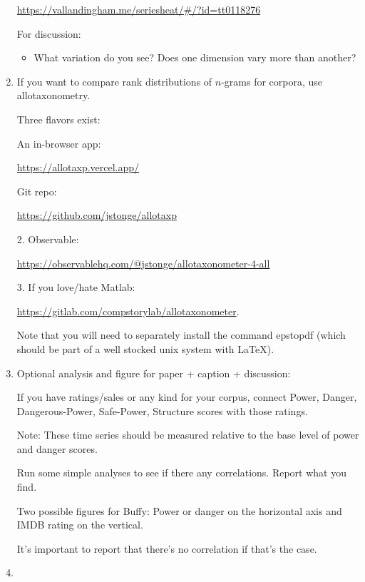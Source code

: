 \begin{enumerate}
  \url{https://vallandingham.me/seriesheat/#/?id=tt0118276}

  For discussion:
  \begin{itemize}
  \item
    What variation do you see? Does one dimension vary more than another?
  \end{itemize}

\item

  If you want to compare rank distributions of $n$-grams for corpora,
  use allotaxonometry.

  Three flavors exist:

  An in-browser app:

  \href{https://allotaxp.vercel.app/}{https://allotaxp.vercel.app/}

  Git repo:
  
  \href{https://github.com/jstonge/allotaxp}{https://github.com/jstonge/allotaxp}
  
  2. Observable:

  \href{https://observablehq.com/@jstonge/allotaxonometer-4-all}{https://observablehq.com/@jstonge/allotaxonometer-4-all}

  3. If you love/hate Matlab:
  
  \href{https://gitlab.com/compstorylab/allotaxonometer}{https://gitlab.com/compstorylab/allotaxonometer}.

  Note that you will need to separately install the command epstopdf (which should be part of a well stocked unix system with \LaTeX).

  
\item
  Optional analysis and figure for paper + caption + discussion:

  If you have ratings/sales or any kind for your corpus,
  connect Power, Danger, Dangerous-Power, Safe-Power, Structure scores
  with those ratings.

  Note: These time series should be measured relative to the base level of power and danger scores.

  Run some simple analyses to see if there any correlations.  Report what you find.

  Two possible figures for Buffy:
  Power or danger on the horizontal axis and IMDB rating on the vertical.

  It's important to report that there's no correlation if that's the case.

\item


\end{enumerate}
